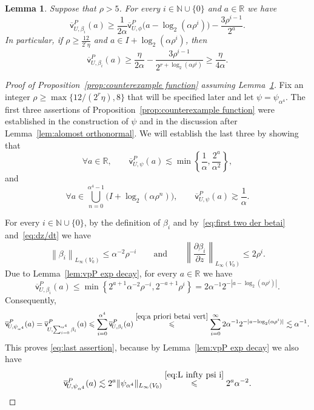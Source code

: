 \documentclass[11pt,reqno]{amsart}
\newcommand{\N}{\mathbb{N}}
\newcommand{\R}{\mathbb{R}}
\newcommand{\0}{\mathbf{0}}
\renewcommand{\1}{\mathbf 1}
\renewcommand{\ge}{\geqslant}
\renewcommand{\le}{\leqslant}
\newtheorem{lemma}[thm]{Lemma}
\theoremstyle{remark}
\newcommand{\vpP}[1]{{\overline{\mathsf{v}}^{P}_{\!#1}}}
\begin{document}
\begin{lemma}\label{lem:relate to phi} Suppose that $\rho>5$. For every $i\in \N\cup\{0\}$ and $a\in \R$ we have
$$
\vpP{U,\beta_i}(a)\ge \frac{1}{2\alpha}\vpP{U,\phi}\big(a-\log_2(\alpha\rho^i)\big)-\frac{3\rho^{i-1}}{2^{a}}.
$$
In particular, if $\rho\ge \frac{12}{2^r\eta}$ and $a\in I+\log_2(\alpha\rho^i)$, then $$\vpP{U,\beta_i}(a) \ge \frac{\eta}{2\alpha}-\frac{3\rho^{i-1}}{2^{r+\log_2(\alpha\rho^i)}} \ge \frac{\eta}{4\alpha}.$$
\end{lemma}

\begin{proof}[Proof of Proposition~\ref{prop:counterexample function} assuming Lemma~\ref{lem:relate to phi}] Fix an integer $\rho\ge \max\{12/(2^r\eta),8\}$ that will be specified later and let $\psi=\psi_{\alpha^4}$.  The first three assertions of Proposition~\ref{prop:counterexample function} were established in the construction of $\psi$ and in the discussion after Lemma~\ref{lem:alomost orthonormal}.  We will establish the last three by showing that
\begin{equation}\label{eq:last assertion}
 \forall a\in \R,\qquad \vpP{U,\psi}(a)\lesssim \min\left\{\frac{1}{\alpha},\frac{2^a}{\alpha^2}\right\},
\end{equation}
and
\begin{equation}\label{eq:assertion four}
 \forall a\in \bigcup_{n=0}^{\alpha^{4}-1}\big( I+  \log_2(\alpha\rho^{n})\big),\qquad \vpP{U,\psi}(a)\gtrsim \frac{1}{\alpha}.
\end{equation}

For every $i\in \N\cup \{0\}$, by the definition of $\beta_i$ and by~\eqref{eq:first two der betai} and~\eqref{eq:dz/dt}  we have $$\left\|\beta_i\right\|_{L_\infty(V_0)}\le \alpha^{-2}\rho^{-i}\qquad\mathrm{and}\qquad \left\|\frac{\partial \beta_i}{\partial z}\right\|_{L_\infty(V_0)}\le 2\rho^i.$$
Due to Lemma~\ref{lem:vpP exp decay}, for every $a\in \R$ we have
\begin{equation}\label{eq:a priori betai vert}
\vpP{U,\beta_i}(a)\le \min\left\{2^{a+1}\alpha^{-2}\rho^{-i},2^{-a+1}\rho^i\right\}=2\alpha^{-1}2^{-|a-\log_2(\alpha\rho^i)|}.
\end{equation}
Consequently,
$$
\vpP{U,\psi_{\alpha^4}}(a)=\vpP{U,\sum_{i=0}^{\alpha^4}\beta_i}(a)\le \sum_{i=0}^{\alpha^4} \vpP{U,\beta_i}(a)\stackrel{\eqref{eq:a priori betai vert}}{\le} \sum_{i=0}^\infty 2\alpha^{-1}2^{-|a-\log_2(\alpha\rho^i)|}\lesssim \alpha^{-1}.
$$
This proves \eqref{eq:last assertion}, because  by Lemma~\ref{lem:vpP exp decay}  we also have $$\vpP{U,\psi_{\alpha^4}}(a)\lesssim 2^a\|\psi_{\alpha^4}\|_{L_\infty(V_0)}\stackrel{\eqref{eq:L infty psi i}}{\le} 2^a\alpha^{-2}.$$


\end{proof}
\end{document}
